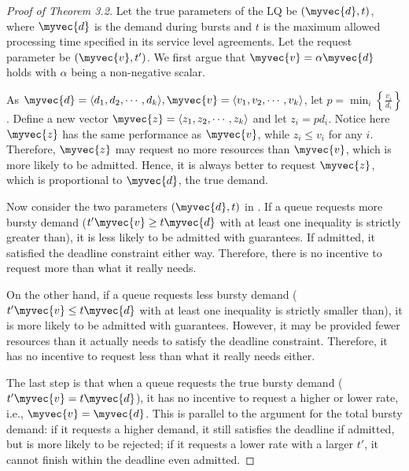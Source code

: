 \documentclass[letterpaper,twocolumn,10pt]{article}
\begin{document}
\begin{proof}[Proof of Theorem 3.2]
	
	Let the true parameters of the LQ be $(\myvec{d},t)$, where $\myvec{d}$ is the demand during bursts and $t$ is the maximum allowed processing time specified in its service level agreements. Let the request parameter be $(\myvec{v},t')$. We first argue that $\myvec{v}=\alpha \myvec{d}$ holds with $\alpha$ being a non-negative scalar.
	
	As $\myvec{d}=\langle d_1,d_2,\cdots,d_k \rangle,\myvec{v}=\langle v_1,v_2,\cdots,v_k \rangle$, let $p= \min_i \left\{\frac{v_i}{d_i}\right\}$. Define a new vector $\myvec{z}= \langle z_1,z_2,\cdots,z_k \rangle$ and let $z_i  = pd_i$. Notice here $\myvec{z}$ has the same performance as $\myvec{v}$, while $z_i \leq v_i$ for any $i$. Therefore, $\myvec{z}$ may request no more resources than $\myvec{v}$, which is more likely to be admitted. Hence, it is always better to request $\myvec{z}$, which is proportional to $\myvec{d}$, the true demand.
	
	
	Now consider the two parameters $(\myvec{d},t)$ in \name. If a queue requests more bursty demand ($t'\myvec{v} \geq t\myvec{d}$ with at least one inequality is strictly greater than), it is less likely to be admitted with guarantees. If admitted, it satisfied the deadline constraint either way. Therefore, there is no incentive to request more than what it really needs.
	
	On the other hand, if a queue requests less bursty demand ($t'\myvec{v} \leq t\myvec{d}$ with at least one inequality is strictly smaller than), it is more likely to be admitted with guarantees. However, it may be provided fewer resources than it actually needs to satisfy the deadline constraint. Therefore, it has no incentive to request less than what it really needs either.
	
	The last step is that when a queue requests the true bursty demand ($t'\myvec{v} = t\myvec{d}$), it has no incentive to request a higher or lower rate, i.e., $\myvec{v}=\myvec{d}$. This is parallel to the argument for the total bursty demand: if it requests a higher demand, it still satisfies the deadline if admitted, but is more likely to be rejected; if it requests a lower rate with a larger $t'$, it cannot finish within the deadline even admitted. 
	

\end{proof}
\end{document}
